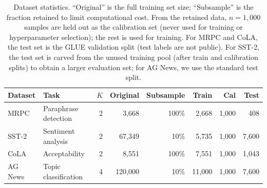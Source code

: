 \begin{table}[h]
\centering
\small
\begin{tabular}{llrrrrrr}
\toprule
\textbf{Dataset} & \textbf{Task} & $K$ & \textbf{Original} & \textbf{Subsample} & \textbf{Train} & \textbf{Cal} & \textbf{Test} \\
\midrule
MRPC    & Paraphrase detection & 2  & 3{,}668   & 100\%  & 2{,}668   & 1{,}000 & 408     \\
SST-2   & Sentiment analysis   & 2  & 67{,}349  & 10\%   & 5{,}735   & 1{,}000 & 7{,}600 \\
CoLA    & Acceptability         & 2  & 8{,}551   & 100\%  & 7{,}551   & 1{,}000 & 1{,}043 \\
AG News & Topic classification & 4  & 120{,}000 & 10\%   & 11{,}000  & 1{,}000 & 7{,}600 \\
\bottomrule
\end{tabular}
\caption{Dataset statistics. ``Original'' is the full training set size; ``Subsample'' is the fraction retained to limit computational cost.
From the retained data, $n=1{,}000$ samples are held out as the calibration set (never used for training or hyperparameter selection); the rest is used for training.
For MRPC and CoLA, the test set is the GLUE validation split (test labels are not public).
For SST-2, the test set is carved from the unused training pool (after train and calibration splits) to obtain a larger evaluation set; for AG News, we use the standard test split.}
\label{tab:dataset_stats}
\end{table}
